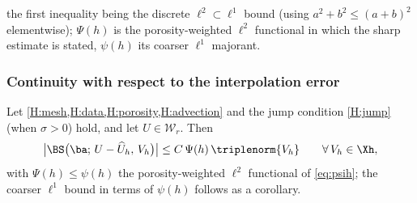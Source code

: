 the first inequality being the discrete $\ell^2\subset\ell^1$ bound (using
$a^2+b^2\le(a+b)^2$ elementwise); $\Psi(h)$ is the porosity{\hyp}weighted $\ell^2$
functional in which the sharp estimate is stated, $\psi(h)$ its coarser $\ell^1$ majorant.

\subsubsection{Continuity with respect to the interpolation error}

\begin{lemma}\label{lem:continterp}
Let \cref{H:mesh,H:data,H:porosity,H:advection} and the jump condition \cref{H:jump} (when $\sigma>0$) hold, and let $U\in\mathcal{W}_r$. Then
\begin{equation}\label{eq:continterp}
  \bigl|\BS\bigl(\ba;\,U-\widehat{U}_h,\,V_h\bigr)\bigr|
  \le C\,\Psi(h)\,\triplenorm{V_h}
  \qquad\forall\,V_h\in\Xh ,
\end{equation}
with $\Psi(h)\le\psi(h)$ the porosity{\hyp}weighted $\ell^2$ functional of \eqref{eq:psih};
the coarser $\ell^1$ bound in terms of $\psi(h)$ follows as a corollary.
\end{lemma}

